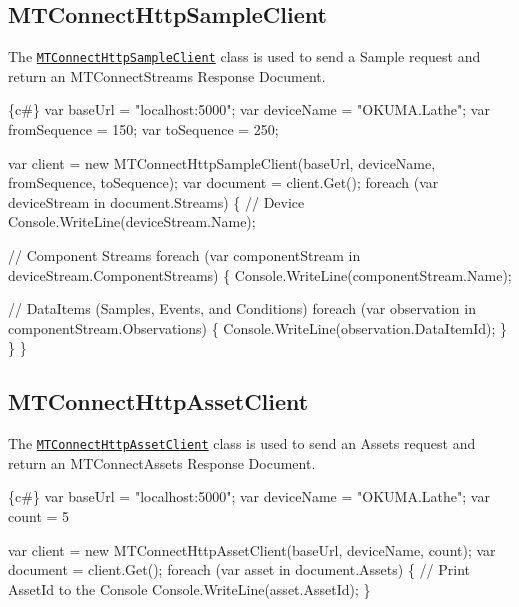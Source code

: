 \subsection*{M\+T\+Connect\+Http\+Sample\+Client}

The \href{MTConnectHttpSampleClient.cs}{\tt M\+T\+Connect\+Http\+Sample\+Client} class is used to send a Sample request and return an M\+T\+Connect\+Streams Response Document. 
\begin{DoxyCode}
\{c#\}
var baseUrl = "localhost:5000";
var deviceName = "OKUMA.Lathe";
var fromSequence = 150;
var toSequence = 250;

var client = new MTConnectHttpSampleClient(baseUrl, deviceName, fromSequence, toSequence);
var document = client.Get();
foreach (var deviceStream in document.Streams)
\{
    // Device
    Console.WriteLine(deviceStream.Name);

    // Component Streams
    foreach (var componentStream in deviceStream.ComponentStreams)
    \{
        Console.WriteLine(componentStream.Name);

        // DataItems (Samples, Events, and Conditions)
        foreach (var observation in componentStream.Observations)
        \{
            Console.WriteLine(observation.DataItemId);
        \}
    \}
\}
\end{DoxyCode}


\subsection*{M\+T\+Connect\+Http\+Asset\+Client}

The \href{MTConnectHttpAssetClient.cs}{\tt M\+T\+Connect\+Http\+Asset\+Client} class is used to send an Assets request and return an M\+T\+Connect\+Assets Response Document. 
\begin{DoxyCode}
\{c#\}
var baseUrl = "localhost:5000";
var deviceName = "OKUMA.Lathe";
var count = 5

var client = new MTConnectHttpAssetClient(baseUrl, deviceName, count);
var document = client.Get();
foreach (var asset in document.Assets)
\{
    // Print AssetId to the Console
    Console.WriteLine(asset.AssetId);
\}
\end{DoxyCode}
 